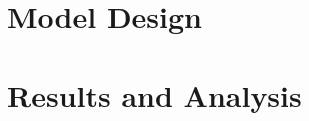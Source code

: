 \documentclass[conference]{IEEEtran}
\begin{document}
	\section{Model Design}
	\section{Results and Analysis}
	
	
	
	
	
	
	
	
	
\end{document}
